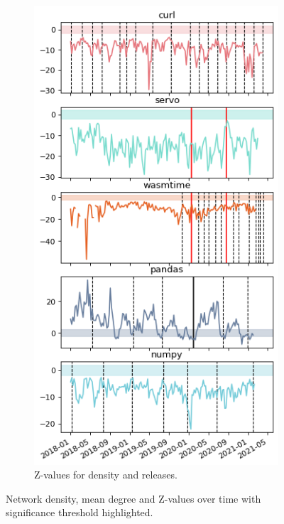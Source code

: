 \begin{figure}
\begin{subfigure}{0.46\textwidth}
        \includegraphics[width=\textwidth]{figures/qualitative/mean_deg_density/mean_deg_z_values.png}
        \caption{Z-values for density and releases.}
        \label{fig:density_b}
    \end{subfigure}
    \caption{Network density, mean degree and Z-values over time with significance threshold highlighted.}
    \label{fig:density}
\end{figure}


